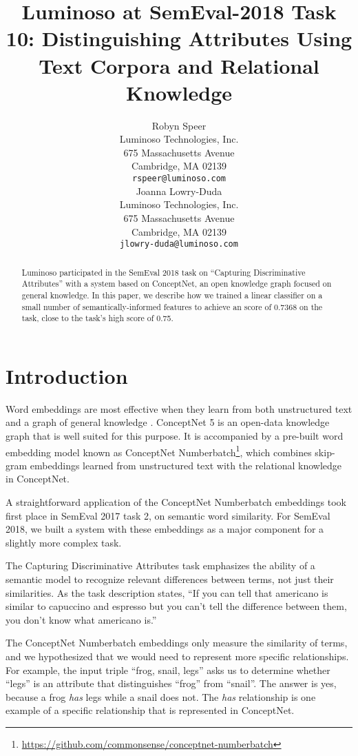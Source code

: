 \documentclass[11pt,a4paper]{article}
\title{Luminoso at SemEval-2018 Task 10: Distinguishing Attributes Using Text Corpora and Relational Knowledge}
\author{Robyn Speer \\
  Luminoso Technologies, Inc. \\
  675 Massachusetts Avenue \\
  Cambridge, MA 02139 \\
  {\tt rspeer@luminoso.com} \\\And
  Joanna Lowry-Duda \\
  Luminoso Technologies, Inc. \\
  675 Massachusetts Avenue \\
  Cambridge, MA 02139 \\
  {\tt jlowry-duda@luminoso.com} \\}
\date{}
\begin{document}
\maketitle
\begin{abstract}

    Luminoso participated in the SemEval 2018 task on ``Capturing
    Discriminative Attributes'' with a system based on ConceptNet, an open
    knowledge graph focused on general knowledge. In this paper, we describe
    how we trained a linear classifier on a small number of
    semantically-informed features to achieve an  score of 0.7368 on the task,
    close to the task's high score of 0.75.

\end{abstract}

\newcommand{\term}[0]{}
\newcommand{\termOne}[0]{}
\newcommand{\termTwo}[0]{}
\newcommand{\att}[0]{}

\section{Introduction}

Word embeddings are most effective when they learn from both unstructured text
and a graph of general knowledge \cite{speer-lowryduda:2017:SemEval}. ConceptNet 5
\cite{speer2017conceptnet} is an open-data knowledge graph that is well suited for
this purpose. It is accompanied by a pre-built word embedding model known as
ConceptNet
Numberbatch\footnote{\url{https://github.com/commonsense/conceptnet-numberbatch}},
which combines skip-gram embeddings learned from unstructured text with the
relational knowledge in ConceptNet.

A straightforward application of the ConceptNet Numberbatch embeddings took first
place in SemEval 2017 task 2, on semantic word similarity. For SemEval 2018, we
built a system with these embeddings as a major component for a slightly more
complex task.

The Capturing Discriminative Attributes task \cite{semeval2018task10} emphasizes
the ability of a semantic model to recognize relevant differences between
terms, not just their similarities. As the task description states, ``If you
can tell that americano is similar to capuccino and espresso but you can't tell
the difference between them, you don't know what americano is.''

The ConceptNet Numberbatch embeddings only measure the similarity of terms,
and we hypothesized that we would need to represent more specific relationships.
For example, the input triple ``frog, snail, legs'' asks us to determine whether
``legs'' is an attribute that distinguishes ``frog'' from ``snail''. The answer
is yes, because a frog \emph{has} legs while a snail does not.
The \emph{has} relationship is one example of a specific relationship that is
represented in ConceptNet.
\end{document}
